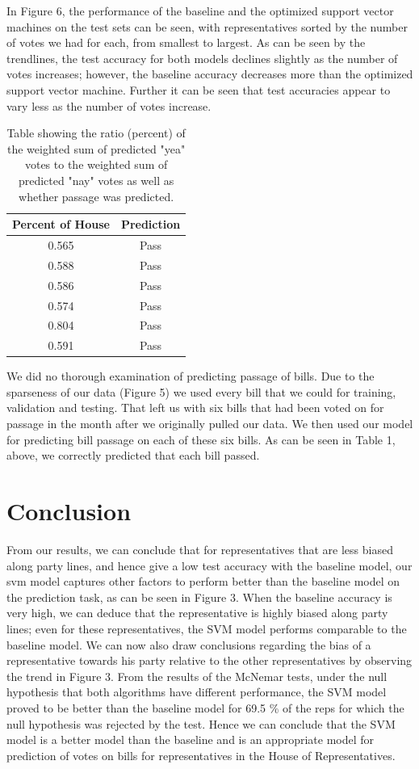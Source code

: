 \documentclass[11pt,letterpaper,twocolumn]{article}
\begin{document}
In Figure 6, the performance of the baseline and the optimized support vector machines on the test sets can be seen, with representatives sorted by the number of votes we had for each, from smallest to largest. As can be seen by the trendlines, the test accuracy for both models declines slightly as the number of votes increases; however, the baseline accuracy decreases more than the optimized support vector machine. Further it can be seen that test accuracies appear to vary less as the number of votes increase.

\begin{table}
\centering
\begin{tabular}{|c|c|} \hline
Percent of House & Prediction \\ \hline
0.565 & Pass \\ \hline
0.588 & Pass\\ \hline
0.586 & Pass\\ \hline
0.574 & Pass\\ \hline
0.804 & Pass\\ \hline
0.591 & Pass\\ \hline
\end{tabular}
\caption{Table showing the ratio (percent) of the weighted sum of predicted "yea" votes to the weighted sum of predicted "nay" votes as well as whether passage was predicted.}
\end{table}

We did no thorough examination of predicting passage of bills. Due to the sparseness of our data (Figure 5) we used every bill that we could for training, validation and testing. That left us with six bills that had been voted on for passage in the month after we originally pulled our data. We then used our model for predicting bill passage on each of these six bills. As can be seen in Table 1, above, we correctly predicted that each bill passed. 

\section{Conclusion}
From our results, we can conclude that for representatives that are less biased along party lines, and hence give a low test accuracy with the baseline model, our svm model captures other factors to perform better than the baseline model on the prediction task, as can be seen in Figure 3. When the baseline accuracy is very high, we can deduce that the representative is highly biased along party lines; even for these representatives, the SVM model performs comparable to the baseline model. We can now also draw conclusions regarding the bias of a representative towards his party relative to the other representatives by observing the trend in Figure 3. From the results of the McNemar tests, under the null hypothesis that both algorithms have different performance, the SVM model proved to be better than the baseline model for 69.5 \% of the reps for which the null hypothesis was rejected by the test. Hence we can conclude that the SVM model is a better model than the baseline and is an appropriate model for prediction of votes on bills for representatives in the House of Representatives.
\end{document}
